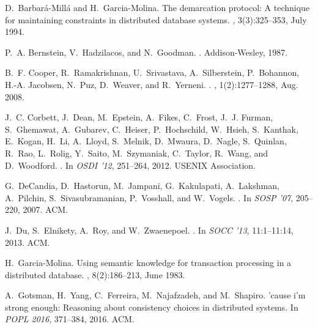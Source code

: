 \documentclass[11pt]{article}
\begin{document}
\begin{thebibliography}{10}
\begin{small}
D.~Barbar\'{a}-Mill\'{a} and H.~Garcia-Molina.
\newblock The demarcation protocol: A technique for maintaining constraints in
  distributed database systems.
, 3(3):325--353, July 1994.

P.~A. Bernstein, V.~Hadzilacos, and N.~Goodman.
.
\newblock Addison-Wesley, 1987.

B.~F. Cooper, R.~Ramakrishnan, U.~Srivastava, A.~Silberstein, P.~Bohannon,
  H.-A. Jacobsen, N.~Puz, D.~Weaver, and R.~Yerneni.
.
, 1(2):1277--1288, Aug. 2008.

J.~C. Corbett, J.~Dean, M.~Epstein, A.~Fikes, C.~Frost, J.~J. Furman,
  S.~Ghemawat, A.~Gubarev, C.~Heiser, P.~Hochschild, W.~Hsieh, S.~Kanthak,
  E.~Kogan, H.~Li, A.~Lloyd, S.~Melnik, D.~Mwaura, D.~Nagle, S.~Quinlan,
  R.~Rao, L.~Rolig, Y.~Saito, M.~Szymaniak, C.~Taylor, R.~Wang, and
  D.~Woodford.
.
\newblock In {\em OSDI '12}, 251--264, 2012. USENIX
  Association.

G.~DeCandia, D.~Hastorun, M.~Jampani, G.~Kakulapati, A.~Lakshman, A.~Pilchin,
  S.~Sivasubramanian, P.~Vosshall, and W.~Vogels.
.
\newblock In {\em  SOSP '07}, 205--220, 2007. ACM.

J.~Du, S.~Elnikety, A.~Roy, and W.~Zwaenepoel.
.
\newblock In {\em  SOCC '13}, 11:1--11:14, 2013. ACM.

H.~Garcia-Molina.
\newblock Using semantic knowledge for transaction processing in a distributed
  database.
, 8(2):186--213, June 1983.

A.~Gotsman, H.~Yang, C.~Ferreira, M.~Najafzadeh, and M.~Shapiro.
\newblock 'cause i'm strong enough: Reasoning about consistency choices in
  distributed systems.
\newblock In {\em POPL 2016}, 371--384, 2016. ACM.


\end{small}
\end{thebibliography}
\end{document}
